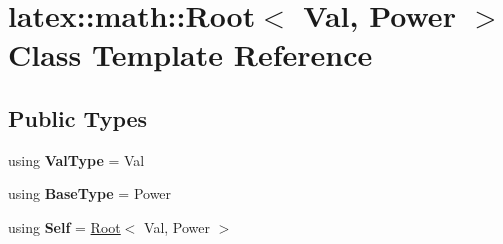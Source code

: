 \hypertarget{classlatex_1_1math_1_1Root}{\section{latex\-:\-:math\-:\-:Root$<$ Val, Power $>$ Class Template Reference}
\label{classlatex_1_1math_1_1Root}
}
\subsection*{Public Types}
\begin{DoxyCompactItemize}
\item 
\hypertarget{classlatex_1_1math_1_1Root_a58328f60cf2e5a35536bb778abd47ec9}{using {\bfseries Val\-Type} = Val}\label{classlatex_1_1math_1_1Root_a58328f60cf2e5a35536bb778abd47ec9}

\item 
\hypertarget{classlatex_1_1math_1_1Root_ae462dadf6e1f1cbbaecc5cf596ae87af}{using {\bfseries Base\-Type} = Power}\label{classlatex_1_1math_1_1Root_ae462dadf6e1f1cbbaecc5cf596ae87af}

\item 
\hypertarget{classlatex_1_1math_1_1Root_a6d713101895d4a60cfe5960caf9c0714}{using {\bfseries Self} = \hyperlink{classlatex_1_1math_1_1Root}{Root}$<$ Val, Power $>$}\label{classlatex_1_1math_1_1Root_a6d713101895d4a60cfe5960caf9c0714}

\end{DoxyCompactItemize}
